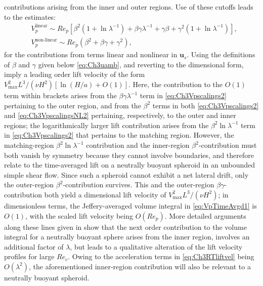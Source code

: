 \documentclass{jfm}
\begin{document}
contributions arising from the inner and outer regions. Use of these cutoffs leads to the estimates:
\begin{subequations}
	\begin{align}
	&V_p^\text{linear}\sim Re_p\left[\beta^2(1+\ln\lambda^{-1})+\beta\gamma\lambda^{-1}+\gamma\beta+\gamma^2(1+\ln\lambda^{-1})\right], \label{eq:Ch3Vpscalings2}\\
	&V_p^\text{non-linear}\sim Re_p\left(\beta^2+\beta\gamma+\gamma^2\right),
	\label{eq:Ch3VpscalingsNL2}
	\end{align}
\end{subequations}
for the contributions from terms linear and nonlinear in $\bm{u}_s$. Using the definitions of $\beta$ and $\gamma$ given below \eqref{eq:Ch3uamb}, and reverting to the dimensional form, imply a leading order lift velocity of the form $V_\text{max}^2 L^3/(\nu H^2)[\ln(H/a)+O(1)]$. Here, the contribution to the $O(1)$ term within brackets arises from the $\beta\gamma\lambda^{-1}$ term in \eqref{eq:Ch3Vpscalings2} pertaining to the outer region, and from the $\beta^2$ terms in both \eqref{eq:Ch3Vpscalings2} and \eqref{eq:Ch3VpscalingsNL2} pertaining, respectively, to the outer and inner regions; the logarithmically larger lift contribution arises from the $\beta^2\ln \lambda^{-1}$ term in \eqref{eq:Ch3Vpscalings2} that pertains to the matching region. 
However, the matching-region $\beta^2\ln \lambda^{-1}$ contribution and the inner-region $\beta^2$-contribution must both vanish by symmetry because they cannot involve boundaries, and therefore relate to the time-averaged lift on a neutrally buoyant spheroid in an unbounded simple shear flow. Since such a spheroid cannot exhibit a net lateral drift, only the outer-region $\beta^2$-contribution survives. This and the outer-region $\beta\gamma$-contribution both yield a dimensional lift velocity of $V_\text{max}^2L^3/(\nu H^2)$; in dimensionless terms, the Jeffery-averaged volume integral in \eqref{eq:VpTimeAvgd1} is $O(1)$, with the scaled lift velocity being $O(Re_p)$. More detailed arguments along these lines given in \cite{anandfinitesize2022} show that the next order contribution to the volume integral for a neutrally buoyant sphere arises from the inner region, involves an additional factor of $\lambda$, but leads to a  qualitative alteration of the lift velocity profiles for large $Re_c$. Owing to the acceleration terms in \eqref{eq:Ch3RTliftvel} being $O(\lambda^2)$, the aforementioned inner-region contribution will also be relevant to a neutrally buoyant spheroid.
\end{document}
